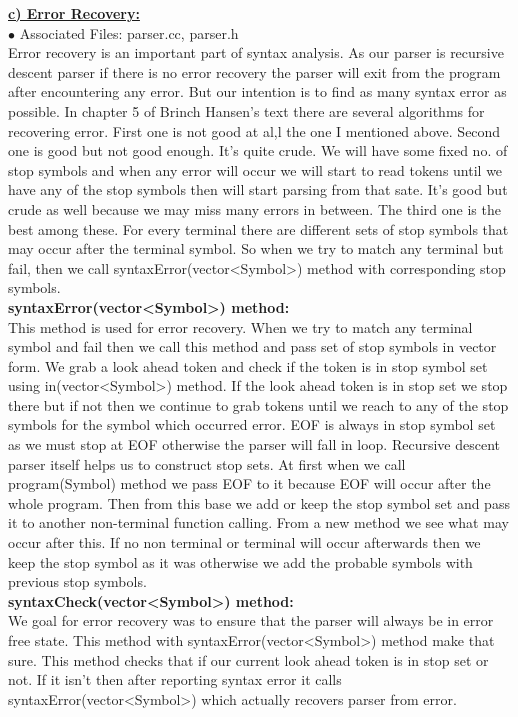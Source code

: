 \documentclass[paper=letter, fontsize=12pt]{scrartcl} %
\begin{document}
\pagebreak
\underline {\bf c) Error Recovery:}\\
$\bullet$ Associated Files: parser.cc, parser.h\\ 

Error recovery is an important part of syntax analysis. As our parser is recursive descent parser if there is no error recovery the parser will exit from the program after encountering any error. But our intention is to find as many syntax error as possible. In chapter 5 of Brinch Hansen's text there are several algorithms for recovering error. First one is not good at al,l the one I mentioned above. Second one is good but not good enough. It's quite crude. We will have some fixed no. of stop symbols and when any error will occur we will start to read tokens until we have any of the stop symbols then will start parsing from that sate. It's good but crude as well because we may miss many errors in between. The third one is the best among these. For every terminal there are different sets of stop symbols that may occur after the terminal symbol. So when we try to match any terminal but fail, then we call syntaxError(vector<Symbol>) method with corresponding stop symbols.\\

{\bf syntaxError(vector<Symbol>) method:}\\
This method is used for error recovery. When we try to match any terminal symbol and fail then we call this method and pass set of stop symbols in vector form. We grab a look ahead token and check if the token is in stop symbol set using in(vector<Symbol>) method. If the look ahead token is in stop set we stop there but if not then we continue to grab tokens until we reach to any of the stop symbols for the symbol which occurred error. EOF is always in stop symbol set as we must stop at EOF otherwise the parser will fall in loop. Recursive descent parser itself helps us to construct stop sets. At first when we call program(Symbol) method we pass EOF to it because EOF will occur after the whole program. Then from this base we add or keep the stop symbol set and pass it to another non-terminal function calling. From a new method we see what may occur after this. If no non terminal or terminal will occur afterwards then we keep the stop symbol as it was otherwise we add the probable symbols with previous stop symbols. \\

{\bf syntaxCheck(vector<Symbol>) method:}\\
We goal for error recovery was to ensure that the parser will always be in error free state. This method with syntaxError(vector<Symbol>) method make that sure. This method checks that if our current look ahead token is in stop set or not. If it isn't then after reporting syntax error it calls syntaxError(vector<Symbol>) which actually recovers parser from error.\\ 
\end{document}

